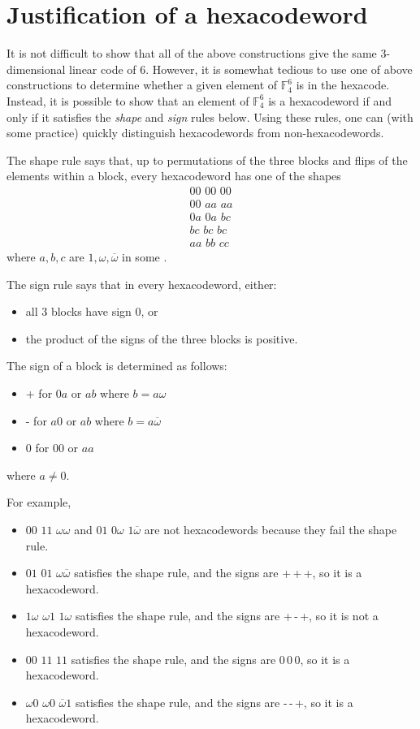 \documentclass[12pt]{article}
\newcommand{\F}{\mathbb{F}}
\newcommand{\w}{\omega}
\newcommand{\W}{\overline{\omega}}
\newcommand{\cw}[6]{#1#2\,\,#3#4\,\,#5#6}
\begin{document}
\section{Justification of a hexacodeword}

It is not difficult to show that all of the above constructions give the same 3-dimensional linear code of  6.  However, it is somewhat tedious to use one of above constructions to determine whether a given element of $\F_4^6$ is in the hexacode.  Instead, it is possible to show that an element of $\F_4^6$ is a hexacodeword if and only if it satisfies the \emph{shape} and \emph{sign} rules below.  Using these rules, one can (with some practice) quickly distinguish hexacodewords from non-hexacodewords.

The shape rule says that, up to permutations of the three blocks and flips of the elements within a block, every hexacodeword has one of the shapes $$\begin{array}{c}
\cw{0}{0}{0}{0}{0}{0}\\
\cw{0}{0}{a}{a}{a}{a}\\
\cw{0}{a}{0}{a}{b}{c}\\
\cw{b}{c}{b}{c}{b}{c}\\
\cw{a}{a}{b}{b}{c}{c}
\end{array}$$ where $a,b,c$ are $1,\w,\W$ in some .

The sign rule says that in every hexacodeword, either:
\begin{itemize}
\item{all 3 blocks have sign 0, or}
\item{the product of the signs of the three blocks is positive.}
\end{itemize}
The sign of a block is determined as follows:
\begin{itemize}
\item{+ for $0a$ or $ab$ where $b = a\w$}
\item{- for $a0$ or $ab$ where $b = a\W$}
\item{0 for $00$ or $aa$}
\end{itemize}
where $a \ne 0$.

For example,
\begin{itemize}
\item{$\cw{0}{0}{1}{1}{\w}{\w}$ and $\cw{0}{1}{0}{\w}{1}{\W}$ are not hexacodewords because they fail the shape rule.}
\item{$\cw{0}{1}{0}{1}{\w}{\W}$ satisfies the shape rule, and the signs are +\,+\,+, so it is a hexacodeword.}
\item{$\cw{1}{\w}{\w}{1}{1}{\w}$ satisfies the shape rule, and the signs are +\,-\,+, so it is not a hexacodeword.}
\item{$\cw{0}{0}{1}{1}{1}{1}$ satisfies the shape rule, and the signs are 0\,0\,0, so it is a hexacodeword.}
\item{$\cw{\w}{0}{\w}{0}{\W}{1}$ satisfies the shape rule, and the signs are -\,-\,+, so it is a hexacodeword.}
\end{itemize}
\end{document}
